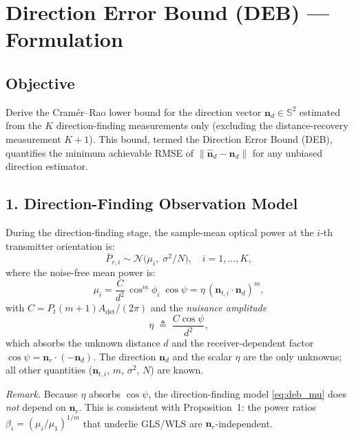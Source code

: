 \documentclass[journal]{IEEEtran}
\begin{document}
\section*{Direction Error Bound (DEB) — Formulation}

\subsection*{Objective}
Derive the Cram\'{e}r--Rao lower bound for the direction vector 
$\mathbf{n}_d \in \mathbb{S}^2$ estimated from the $K$ direction-finding 
measurements only (excluding the distance-recovery measurement $K{+}1$).
This bound, termed the Direction Error Bound (DEB), quantifies the minimum 
achievable RMSE of $\|\hat{\mathbf{n}}_d - \mathbf{n}_d\|$ for any unbiased 
direction estimator.

\subsection*{1. Direction-Finding Observation Model}

During the direction-finding stage, the sample-mean optical power at the 
$i$-th transmitter orientation is:
\begin{equation}
  \bar{P}_{r,i} \sim \mathcal{N}\!\bigl(\mu_i,\;\sigma^2/N\bigr),
  \quad i = 1,\dots,K,
  \label{eq:deb_obs}
\end{equation}
where the noise-free mean power is:
\begin{equation}
  \mu_i = \frac{C}{d^2}\,\cos^m\!\phi_i\;\cos\psi
        = \eta\,(\mathbf{n}_{t,i}\cdot\mathbf{n}_d)^m,
  \label{eq:deb_mu}
\end{equation}
with $C = P_t(m{+}1)A_{\mathrm{det}}/(2\pi)$ and the \emph{nuisance amplitude}
\begin{equation}
  \eta \;\triangleq\; \frac{C\cos\psi}{d^2},
  \label{eq:deb_eta}
\end{equation}
which absorbs the unknown distance $d$ and the receiver-dependent factor 
$\cos\psi = \mathbf{n}_r\!\cdot\!(-\mathbf{n}_d)$.
The direction $\mathbf{n}_d$ and the scalar $\eta$ are the only unknowns; 
all other quantities ($\mathbf{n}_{t,i}$, $m$, $\sigma^2$, $N$) are known.

\emph{Remark.}  
Because $\eta$ absorbs $\cos\psi$, the direction-finding model 
\eqref{eq:deb_mu} does \emph{not} depend on $\mathbf{n}_r$.  
This is consistent with Proposition~1: the power ratios 
$\beta_i = (\mu_i/\mu_1)^{1/m}$ that underlie GLS/WLS are 
$\mathbf{n}_r$-independent.
\end{document}
